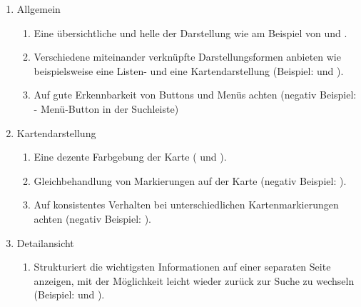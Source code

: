 \documentclass[../Bachelorarbeit.tex]{subfiles}
\begin{document}
\begin{enumerate}
	\item Allgemein
	\begin{enumerate}
		\item[] Eine übersichtliche und helle der Darstellung wie am Beispiel von  und .
		\item[] Verschiedene miteinander verknüpfte Darstellungsformen anbieten wie beispielsweise eine Listen- und eine Kartendarstellung (Beispiel:  und ).
		\item[] Auf gute Erkennbarkeit von Buttons und Menüs achten (negativ Beispiel:  - Menü-Button in der Suchleiste)
	\end{enumerate}
	\item Kartendarstellung
	\begin{enumerate}
		\item[] Eine dezente Farbgebung der Karte ( und ).
		\item[] Gleichbehandlung von Markierungen auf der Karte (negativ Beispiel: ).
		\item[] Auf konsistentes Verhalten bei unterschiedlichen Kartenmarkierungen achten (negativ Beispiel: ).
	\end{enumerate}
	\item Detailansicht
	\begin{enumerate}
		\item[] Strukturiert die wichtigsten Informationen auf einer separaten Seite anzeigen, mit der Möglichkeit leicht wieder zurück zur Suche zu wechseln (Beispiel:  und ).
	\end{enumerate}
\end{enumerate}
\end{document}
